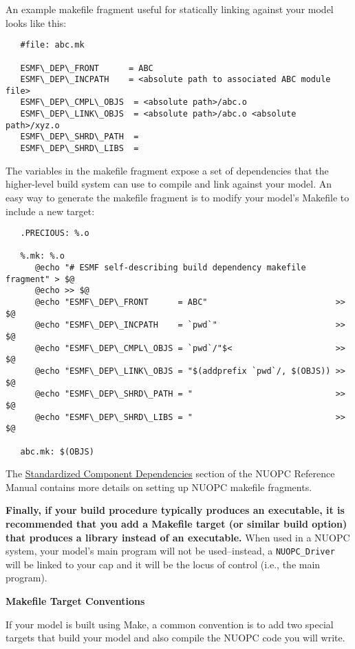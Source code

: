 An example makefile fragment useful for statically linking against your model looks like this:

\begin{verbatim}
   #file: abc.mk
 
   ESMF\_DEP\_FRONT      = ABC
   ESMF\_DEP\_INCPATH    = <absolute path to associated ABC module file>
   ESMF\_DEP\_CMPL\_OBJS  = <absolute path>/abc.o
   ESMF\_DEP\_LINK\_OBJS  = <absolute path>/abc.o <absolute path>/xyz.o
   ESMF\_DEP\_SHRD\_PATH  = 
   ESMF\_DEP\_SHRD\_LIBS  =
\end{verbatim}

The variables in the makefile fragment expose a set of dependencies that the
higher-level build system can use to compile and link against your model.
An easy way to generate the makefile fragment is to modify your model's
Makefile to include a new target:

\begin{verbatim}
   .PRECIOUS: %.o

   %.mk: %.o
      @echo "# ESMF self-describing build dependency makefile fragment" > $@
      @echo >> $@
      @echo "ESMF\_DEP\_FRONT      = ABC"                          >> $@
      @echo "ESMF\_DEP\_INCPATH    = `pwd`"                        >> $@
      @echo "ESMF\_DEP\_CMPL\_OBJS = `pwd`/"$<                     >> $@
      @echo "ESMF\_DEP\_LINK\_OBJS = "$(addprefix `pwd`/, $(OBJS)) >> $@
      @echo "ESMF\_DEP\_SHRD\_PATH = "                             >> $@
      @echo "ESMF\_DEP\_SHRD\_LIBS = "                             >> $@

   abc.mk: $(OBJS)
\end{verbatim}

The \href{http://www.earthsystemmodeling.org/esmf\_releases/last\_built/NUOPC\_refdoc/node5.html}{Standardized Component Dependencies}
section of the NUOPC Reference Manual contains more details on setting up NUOPC makefile fragments.

\textbf{Finally, if your build procedure typically produces an executable, it is
recommended that you add a Makefile target (or similar build option)
that produces a library instead of an executable.}  When used in a NUOPC
system, your model's main program will not be used--instead, a {\tt NUOPC\_Driver}
will be linked to your cap and it will be the locus of control
(i.e., the main program).

\textbf{Makefile Target Conventions}

If your model is built using Make, a common convention is to add
two special targets that build your model and also compile the NUOPC
code you will write.

